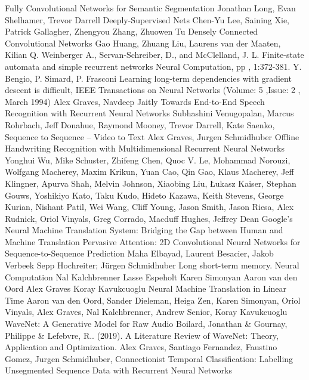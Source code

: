 \documentclass[a4paper,11pt,twoside]{report}
\theoremstyle{definition}
\begin{document}
\begin{thebibliography}{20}
Fully Convolutional Networks for Semantic Segmentation Jonathan Long, Evan Shelhamer, Trevor Darrell
Deeply-Supervised Nets Chen-Yu Lee, Saining Xie, Patrick Gallagher, Zhengyou Zhang, Zhuowen Tu
Densely Connected Convolutional Networks Gao Huang, Zhuang Liu, Laurens van der Maaten, Kilian Q. Weinberger
 A., Servan-Schreiber, D., and McClelland, J. L. Finite-state automata and simple recurrent networks Neural Computation, pp , 1:372-381.
 Y. Bengio, P. Simard, P. Frasconi Learning long-term dependencies with gradient descent is difficult, IEEE Transactions on Neural Networks (Volume: 5 ,Issue: 2 , March 1994)
 Alex Graves, Navdeep Jaitly Towards End-to-End Speech Recognition with Recurrent Neural Networks
 Subhashini Venugopalan, Marcus Rohrbach, Jeff Donahue, Raymond Mooney, Trevor Darrell, Kate Saenko,  Sequence to Sequence -- Video to Text
 Alex Graves, Jurgen Schmidhuber Offline Handwriting Recognition with Multidimensional Recurrent Neural Networks
 Yonghui Wu, Mike Schuster, Zhifeng Chen, Quoc V. Le, Mohammad Norouzi, Wolfgang Macherey, Maxim Krikun, Yuan Cao, Qin Gao, Klaus Macherey, Jeff Klingner, Apurva Shah, Melvin Johnson, Xiaobing Liu, Łukasz Kaiser, Stephan Gouws, Yoshikiyo Kato, Taku Kudo, Hideto Kazawa, Keith Stevens, George Kurian, Nishant Patil, Wei Wang, Cliff Young, Jason Smith, Jason Riesa, Alex Rudnick, Oriol Vinyals, Greg Corrado, Macduff Hughes, Jeffrey Dean Google's Neural Machine Translation System: Bridging the Gap between Human and Machine Translation
Pervasive Attention: 2D Convolutional Neural Networks for Sequence-to-Sequence Prediction Maha Elbayad, Laurent Besacier, Jakob Verbeek
 Sepp Hochreiter; Jürgen Schmidhuber Long short-term memory. Neural Computation
 Nal Kalchbrenner  Lasse Espeholt  Karen Simonyan  Aaron van den Oord  Alex Graves  Koray Kavukcuoglu Neural Machine Translation in Linear Time
Aaron van den Oord, Sander Dieleman, Heiga Zen, Karen Simonyan, Oriol Vinyals, Alex Graves, Nal Kalchbrenner, Andrew Senior, Koray Kavukcuoglu WaveNet: A Generative Model for Raw Audio
 Boilard, Jonathan \& Gournay, Philippe \& Lefebvre, R.. (2019). A Literature Review of WaveNet: Theory, Application and Optimization. 
Alex Graves, Santiago Fernandez, Faustino Gomez, Jurgen Schmidhuber, Connectionist Temporal Classification: Labelling Unsegmented Sequence Data with Recurrent Neural Networks

\end{thebibliography}
\end{document}
